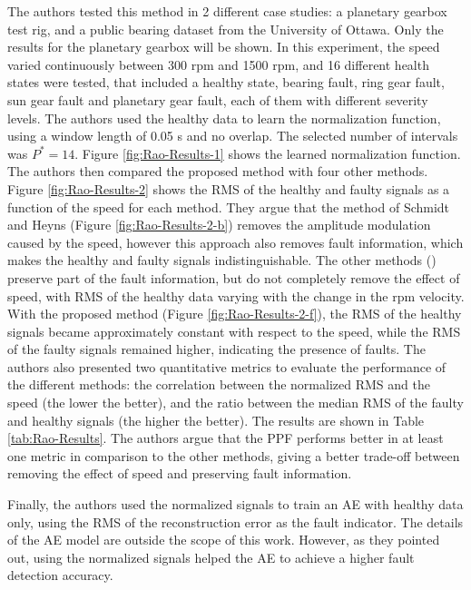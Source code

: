 The authors tested this method in 2 different case studies: a planetary gearbox test rig, and a public bearing dataset from the University of Ottawa. Only the results for the planetary gearbox will be shown. In this experiment, the speed varied continuously between 300 rpm and 1500 rpm, and 16 different health states were tested, that included a healthy state, bearing fault, ring gear fault, sun gear fault and planetary gear fault, each of them with different severity levels. The authors used the healthy data to learn the normalization function, using a window length of 0.05 s and no overlap. The selected number of intervals was $P^* = 14$. Figure \ref{fig:Rao-Results-1} shows the learned normalization function. The authors then compared the proposed method with four other methods. Figure \ref{fig:Rao-Results-2} shows the RMS of the healthy and faulty signals as a function of the speed for each method. They argue that the method of Schmidt and Heyns (Figure \ref{fig:Rao-Results-2-b}) removes the amplitude modulation caused by the speed, however this approach also removes fault information, which makes the healthy and faulty signals indistinguishable. The other methods () preserve part of the fault information, but do not completely remove the effect of speed, with RMS of the healthy data varying with the change in the rpm velocity. With the proposed method (Figure \ref{fig:Rao-Results-2-f}), the RMS of the healthy signals became approximately constant with respect to the speed, while the RMS of the faulty signals remained higher, indicating the presence of faults. The authors also presented two quantitative metrics to evaluate the performance of the different methods: the correlation between the normalized RMS and the speed (the lower the better), and the ratio between the median RMS of the faulty and healthy signals (the higher the better). The results are shown in Table \ref{tab:Rao-Results}. The authors argue that the PPF performs better in at least one metric in comparison to the other methods, giving a better trade-off between removing the effect of speed and preserving fault information.

Finally, the authors used the normalized signals to train an AE with healthy data only, using the RMS of the reconstruction error as the fault indicator. The details of the AE model are outside the scope of this work. However, as they pointed out, using the normalized signals helped the AE to achieve a higher fault detection accuracy.

